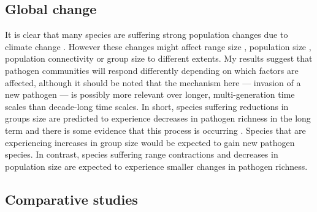 \subsection{Global change}

It is clear that many species are suffering strong population changes due to climate change \cite{thomas2004extinction}.
However these changes might affect range size \cite{thomas2004extinction}, population size \cite{craigie2010large}, population connectivity \cite{wasserman2013population, rivera2015habitat, fonturbel2014forest} or group size \cite{lehmann2010apes, zunino2007habitat, manor2003impact, atwood2006influence} to different extents.
My results suggest that pathogen communities will respond differently depending on which factors are affected, although it should be noted that the mechanism here --- invasion of a new pathogen --- is possibly more relevant over longer, multi-generation time scales than decade-long time scales.
In short, species suffering reductions in groups size \cite{lehmann2010apes, zunino2007habitat, manor2003impact, atwood2006influence} are predicted to experience decreases in pathogen richness in the long term and there is some evidence that this process is occurring \cite{altizer2007threatened, turmelle2009correlates}.
Species that are experiencing increases in group size \cite{lehmann2010apes} would be expected to gain new pathogen species.
In contrast, species suffering range contractions \cite{thomas2004extinction} and decreases in population size \cite{craigie2010large} are expected to experience smaller changes in pathogen richness.


\subsection{Comparative studies}

